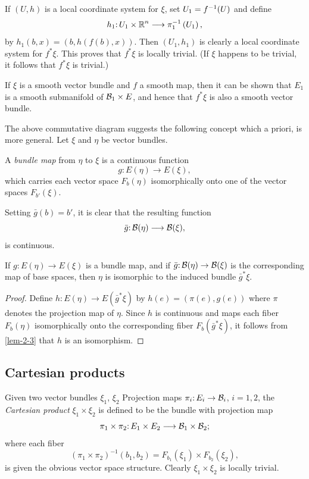 If $(U,h)$ is a local coordinate system for $\xi$, set $U_1 = f^{-1}(U)$ and
define
\[h_{1}\mathpunct{:} U_{1} \times \boldsymbol{\mathbb{R}}^{n} \longrightarrow \pi_{1}^{-1}\left(U_{1}\right),\]
by $h_{1}(b, x)=(b, h(f(b), x))$. Then $(U_1, h_1)$ is clearly a local coordinate
system for $f^*\xi$. This proves that $f^*\xi$ is locally trivial. (If $\xi$ happens
to be trivial, it follows that $f^*\xi$ is trivial.)

\begin{remark*}
	If $\xi$ is a smooth vector bundle and $f$ a smooth map, then
	it can be shown that $E_1$ is a smooth submanifold of $\mathcal{B}_1 \times E$, and hence
	that $f^*\xi$ is also a smooth vector bundle.
\end{remark*}

The above commutative diagram suggests the following concept which
a priori, is more general. Let $\xi$ and $\eta$ be vector bundles.

\begin{definition}\label{def:3-1}
	A \textit{bundle map} from $\eta$ to $\xi$ is a continuous function
	\[g\mathpunct{:}E(\eta)\longrightarrow E(\xi), \]
	which carries each vector space $F_b(\eta)$ isomorphically onto one of the
	vector spaces $F_{b'}(\xi)$.
\end{definition}

Setting $\bar{g}(b) =
b'$, it is clear that the resulting function
\[\bar{g}\mathpunct{:}\mathcal{B}(\eta)\longrightarrow \mathcal{B}(\xi), \]
is continuous.

\begin{lemma}\label{lem-3-1}
	If $g\mathpunct{:}E(\eta)\rightarrow E(\xi)$ is a bundle map, and if
	$\bar{g}\mathpunct{:}\mathcal{B}(\eta)\rightarrow \mathcal{B}(\xi)$  is the corresponding map of base spaces, then
	$\eta$ is isomorphic to the induced bundle $\bar{g}^*\xi$.
\end{lemma}

\begin{proof}
	Define $h\mathpunct{:}E(\eta)\rightarrow E(\bar{g}^*\xi)$ by $h(e)=(\pi(e),g(e))$ where $\pi$ denotes the projection map of $\eta$. Since $h$ is continuous and
	maps each fiber $F_b(\eta)$ isomorphically onto the corresponding fiber
	$F_b(\bar{g}^*\xi)$, it follows from \cref{lem-2-3} that $h$ is an isomorphism.
\end{proof}
\subsection*{Cartesian products}
Given two vector bundles $\xi_1$, $\xi_2$ Projection maps $\pi_i\mathpunct{:}E_i\to \mathcal{B}_i$, $i =
1, 2$, the \textit{Cartesian product}  $\xi_1\times\xi_2$ is defined to be the bundle with projection map
\[\pi_1\times\pi_2\mathpunct{:}E_1\times E_2\longrightarrow \mathcal{B}_1\times\mathcal{B}_2;\]
where each fiber
\[\left(\pi_{1} \times \pi_{2}\right)^{-1}\left(b_{1}, b_{2}\right)=F_{b_{1}}\left(\xi_{1}\right) \times F_{b_{2}}\left(\xi_{2}\right), \]
is given the obvious vector space structure. Clearly $\xi_1\times\xi_2$ is locally
trivial.



